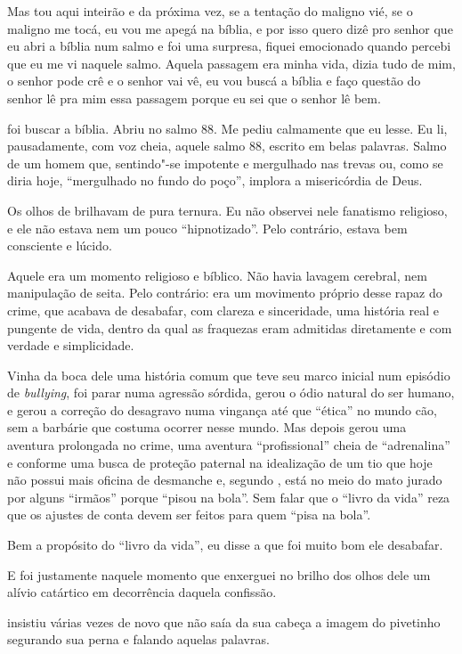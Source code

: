 Mas tou aqui inteirão e da próxima vez, se a tentação do maligno vié, se
o maligno me tocá, eu vou me apegá na bíblia, e por isso quero dizê pro
senhor que eu abri a bíblia num salmo e foi uma surpresa, fiquei
emocionado quando percebi que eu me vi naquele salmo. Aquela passagem
era minha vida, dizia tudo de mim, o senhor pode crê e o senhor vai vê,
eu vou buscá a bíblia e faço questão do senhor lê pra mim essa passagem
porque eu sei que o senhor lê bem.

\asterisc{}

 foi buscar a bíblia. Abriu no salmo 88. Me pediu calmamente que eu
lesse. Eu li, pausadamente, com voz cheia, aquele salmo 88, escrito em
belas palavras. Salmo de um homem que, sentindo"-se impotente e
mergulhado nas trevas ou, como se diria hoje, ``mergulhado no fundo do
poço'', implora a misericórdia de Deus.

Os olhos de  brilhavam de pura ternura. Eu não observei nele fanatismo
religioso, e ele não estava nem um pouco ``hipnotizado''. Pelo
contrário, estava bem consciente e lúcido.

Aquele era um momento religioso e bíblico. Não havia lavagem cerebral,
nem manipulação de seita. Pelo contrário: era um movimento próprio desse
rapaz do crime, que acabava de desabafar, com clareza e sinceridade, uma
história real e pungente de vida, dentro da qual as fraquezas eram
admitidas diretamente e com verdade e simplicidade.

Vinha da boca dele uma história comum que teve seu marco inicial num
episódio de \emph{bullying}, foi parar numa agressão sórdida, gerou o
ódio natural do ser humano, e gerou a correção do desagravo numa
vingança até que ``ética'' no mundo cão, sem a barbárie que costuma
ocorrer nesse mundo. Mas depois gerou uma aventura prolongada no crime,
uma aventura ``profissional'' cheia de ``adrenalina'' e conforme uma
busca de proteção paternal na idealização de um tio que hoje não possui
mais oficina de desmanche e, segundo , está no meio do mato jurado por
alguns ``irmãos'' porque ``pisou na bola''. Sem falar que o ``livro da
vida'' reza que os ajustes de conta devem ser feitos para quem ``pisa na
bola''.

Bem a propósito do ``livro da vida'', eu disse a  que foi muito bom
ele desabafar.

E foi justamente naquele momento que enxerguei no brilho dos olhos dele
um alívio catártico em decorrência daquela confissão.

 insistiu várias vezes de novo que não saía da sua cabeça a imagem do
pivetinho segurando sua perna e falando aquelas palavras.


